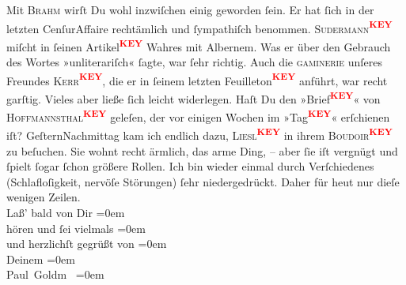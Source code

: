 \begin{ledgroupsized}[t]{13cm}
           Mit \textsc{Brahm} wirſt Du wohl {\pb} inzwiſchen einig geworden
                    ſein. Er hat ſich in der letzten CenſurAffaire recht\label{XXXXv}\label{XXXX}ämlich und ſympathiſch benommen. \pend
           \pstart
           \textsc{Sudermann\textcolor{red}{\textsuperscript{\textbf{KEY}}}} miſcht in ſeinen Artikel\textcolor{red}{\textsuperscript{\textbf{KEY}}} Wahres mit Albernem.
                    Was er über den Gebrauch des Wortes »unliterariſch« ſagte, war ſehr richtig.
                    Auch die \textsc{gaminerie} unſeres Freundes \textsc{Kerr\textcolor{red}{\textsuperscript{\textbf{KEY}}}}, die er in ſeinem letzten Feuilleton\textcolor{red}{\textsuperscript{\textbf{KEY}}} anführt,
                    war recht garſtig. Vieles aber ließe ſich leicht widerlegen. {\pb}\pend
           \pstart
           Haſt Du den »Brief\textcolor{red}{\textsuperscript{\textbf{KEY}}}« von \textsc{Hoffmannsthal\textcolor{red}{\textsuperscript{\textbf{KEY}}}} geleſen, der vor einigen Wochen im »Tag\textcolor{red}{\textsuperscript{\textbf{KEY}}}«
                    erſchienen iſt? \pend
           \pstart
           GeſternNachmittag kam ich endlich dazu, \textsc{Liesl\textcolor{red}{\textsuperscript{\textbf{KEY}}}} in ihrem \textsc{Boudoir\textcolor{red}{\textsuperscript{\textbf{KEY}}}} zu beſuchen. Sie wohnt recht ärmlich, das arme Ding, – aber ſie iſt
                    vergnügt und ſpielt ſogar ſchon größere Rollen. \pend
           \pstart
           Ich bin wieder einmal durch Verſchiedenes (Schlafloſigkeit, nervöſe Störungen)
                    ſehr {\pb} niedergedrückt. Daher für
                        heut nur dieſe wenigen Zeilen. \pend
           \pstart
           {\\[\baselineskip]}Laß’ bald von Dir\pend
           \leftskip=0em{}\pstart
           {\\[\baselineskip]}hören und ſei vielmals\pend
           \leftskip=0em{}\pstart
           {\\[\baselineskip]}und herzlichſt gegrüßt von\pend
           \leftskip=0em{}\pstart
           {\\[\baselineskip]}Deinem\pend
           \leftskip=0em{}\pstart
           {\\[\baselineskip]}\spacefill\mbox{Paul Goldm }\pend
           \leftskip=0em{}
         
         \endnumbering{}\end{ledgroupsized}\begin{anhang}\end{anhang}\newcommand{\dateiname}{L03229}\newcommand{\titel}{Paul Goldmann an Arthur Schnitzler, 10. 11. [1902]}\newcommand{\editorInnen}{Martin Anton Müller und Laura Untner}
      
